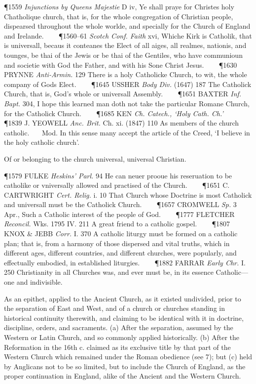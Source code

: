 \begin{description}[wide, labelwidth=!, labelindent=0pt]
\begin{myenumerate}
\P 1559 \textit{Injunctions  by Queens Majestie} D iv, Ye shall praye for Christes holy Chatholique church, that is, for the whole congregation of Christian people, dispearsed throughout the whole worlde, and specially for the Church of England and Irelande.    
\P 1560–61 \textit{Scotch Conf. Faith} xvi, Whiche Kirk is Catholik, that is universall, becaus it conteanes the Elect of all aiges, all realmes, nationis, and tounges, be thai of the Jewis or be thai of the Gentiles, who have communioun and societie with God the Father, and with his Sone Christ Jesus.    
\P 1630 PRYNNE  \textit{Anti-Armin.} 129 There is a holy Catholicke Church, to wit, the whole company of Gods Elect.    
\P 1645 USSHER  \textit{Body Div.} (1647) 187 The Catholick Church, that is, God's whole or universall Assembly.    
\P 1651 BAXTER  \textit{Inf. Bapt.} 304, I hope this learned man doth not take the particular Romane Church, for the Catholick Church.    
\P 1685 KEN  \textit{Ch. Catech., ‘Holy Cath. Ch.’}    
\P 1839 J. YEOWELL  \textit{Anc. Brit.} Ch. xi. (1847) 110 As members of the church catholic.    Mod. In this sense many accept the article of the Creed, ‘I believe in the holy catholic church’.

 Of or belonging to the church universal, universal Christian.

\P 1579 FULKE  \textit{Heskins' Parl.} 94 He can neuer prooue his reseruation to be catholike or vniversally allowed and practised of the Church.    
\P 1651 C. CARTWRIGHT  \textit{Cert. Relig.} i. 10 That Church whose Doctrine is most Catholick and universall must be the Catholick Church.    
\P 1657 CROMWELL  \textit{Sp.} 3 Apr., Such a Catholic interest of the people of God.    
\P 1777 FLETCHER \textit{Reconcil.} Wks. 1795 IV. 211  A great friend to a catholic gospel.    
\P 1807 KNOX  \& JEBB \textit{Corr.} I. 370 A catholic liturgy must be formed on a catholic plan; that is, from a harmony of those dispersed and vital truths, which in different ages, different countries, and different churches, were popularly, and effectually embodied, in established liturgies.    
\P 1882 FARRAR  \textit{Early Chr.} I. 250 Christianity in all Churches was, and ever must be, in its essence Catholic—one and indivisible.

 As an epithet, applied to the Ancient Church, as it existed undivided, prior to the separation of East and West, and of a church or churches standing in historical continuity therewith, and claiming to be identical with it in doctrine, discipline, orders, and sacraments. (a) After the separation, assumed by the Western or Latin Church, and so commonly applied historically. (b) After the Reformation in the 16th c. claimed as its exclusive title by that part of the Western Church which remained under the Roman obedience (see 7); but (c) held by Anglicans not to be so limited, but to include the Church of England, as the proper continuation in England, alike of the Ancient and the Western Church.


\end{myenumerate}
\end{description}
